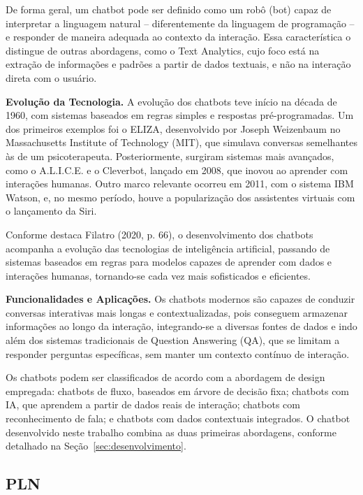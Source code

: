 \documentclass[12pt]{article}
\begin{document}
De forma geral, um chatbot pode ser definido como um robô (bot) capaz de
interpretar a linguagem natural -- diferentemente da linguagem de
programação -- e responder de maneira adequada ao contexto da interação.
Essa característica o distingue de outras abordagens, como o Text
Analytics, cujo foco está na extração de informações e padrões a partir
de dados textuais, e não na interação direta com o usuário.

\textbf{Evolução da Tecnologia.} A evolução dos chatbots teve início na
década de 1960, com sistemas baseados em regras simples e respostas
pré-programadas. Um dos primeiros exemplos foi o ELIZA, desenvolvido por
Joseph Weizenbaum no Massachusetts Institute of Technology (MIT), que
simulava conversas semelhantes às de um psicoterapeuta. Posteriormente,
surgiram sistemas mais avançados, como o A.L.I.C.E. e o Cleverbot,
lançado em 2008, que inovou ao aprender com interações humanas. Outro
marco relevante ocorreu em 2011, com o sistema IBM Watson, e, no mesmo
período, houve a popularização dos assistentes virtuais com o lançamento
da Siri.

Conforme destaca Filatro (2020, p. 66), o desenvolvimento dos chatbots
acompanha a evolução das tecnologias de inteligência artificial, passando
de sistemas baseados em regras para modelos capazes de aprender com dados
e interações humanas, tornando-se cada vez mais sofisticados e
eficientes.

\textbf{Funcionalidades e Aplicações.} Os chatbots modernos são capazes de
conduzir conversas interativas mais longas e contextualizadas, pois
conseguem armazenar informações ao longo da interação, integrando-se a
diversas fontes de dados e indo além dos sistemas tradicionais de
Question Answering (QA), que se limitam a responder perguntas
específicas, sem manter um contexto contínuo de interação.

Os chatbots podem ser classificados de acordo com a abordagem de design
empregada: chatbots de fluxo, baseados em árvore de decisão fixa;
chatbots com IA, que aprendem a partir de dados reais de interação;
chatbots com reconhecimento de fala; e chatbots com dados contextuais
integrados. O chatbot desenvolvido neste trabalho combina as duas
primeiras abordagens, conforme detalhado na Seção~\ref{sec:desenvolvimento}.

\subsection{PLN}\label{sec:pln}
\end{document}
